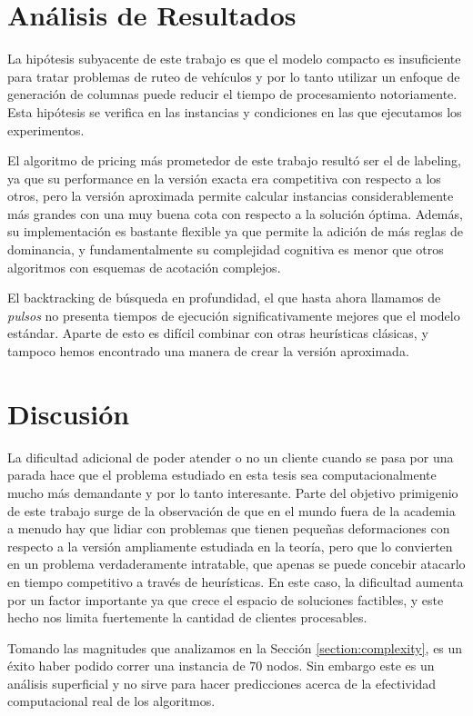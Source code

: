 \section{Análisis de Resultados}

La hipótesis subyacente de este trabajo es que el modelo compacto es insuficiente para tratar problemas de ruteo de vehículos y por lo tanto utilizar un enfoque de generación de columnas puede reducir el tiempo de procesamiento notoriamente. Esta hipótesis se verifica en las instancias y condiciones en las que ejecutamos los experimentos.

El algoritmo de pricing más prometedor de este trabajo resultó ser el de labeling, ya que su performance en la versión exacta era competitiva con respecto a los otros, pero la versión aproximada permite calcular instancias considerablemente más grandes con una muy buena cota con respecto a la solución óptima. Además,  su implementación es bastante flexible ya que permite la adición de más reglas de dominancia, y fundamentalmente su complejidad cognitiva es menor que otros algoritmos con esquemas de acotación complejos.

El backtracking de búsqueda en profundidad, el que hasta ahora llamamos de \emph{pulsos} no presenta tiempos de ejecución significativamente mejores que el modelo estándar. Aparte de esto es difícil combinar con otras heurísticas clásicas, y tampoco hemos encontrado una manera de crear la versión aproximada.


\section{Discusión}

La dificultad adicional de poder atender o no un cliente cuando se pasa por una parada hace que el problema estudiado en esta tesis sea computacionalmente mucho más demandante y por lo tanto interesante. Parte del objetivo primigenio de este trabajo surge de la observación de que en el mundo fuera de la academia a menudo hay que lidiar con problemas que tienen pequeñas deformaciones con respecto a la versión ampliamente estudiada en la teoría, pero que lo convierten en un problema verdaderamente intratable, que apenas se puede concebir atacarlo en tiempo competitivo a través de heurísticas. En este caso, la dificultad aumenta por un factor importante ya que crece el espacio de soluciones factibles, y este hecho nos limita fuertemente la cantidad de clientes procesables.

Tomando las magnitudes que analizamos en la Sección \ref{section:complexity}, es un éxito haber podido correr una instancia de 70 nodos. Sin embargo este es un análisis superficial y no sirve para hacer predicciones acerca de la efectividad computacional real de los algoritmos. 

